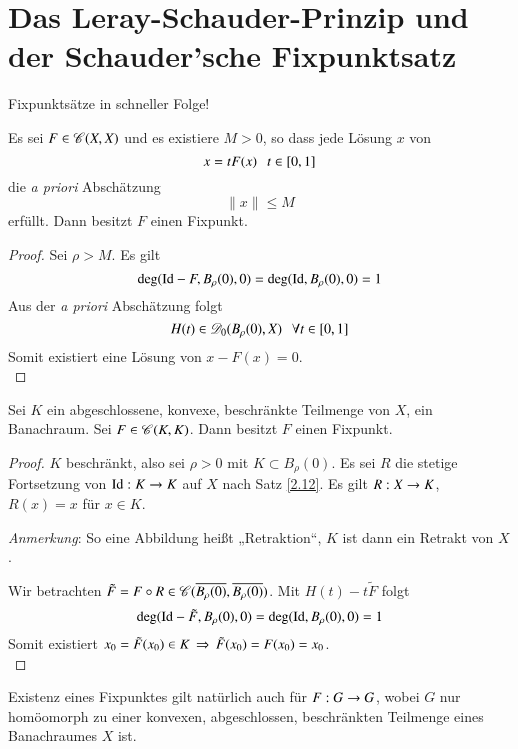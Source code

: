\section{Das Leray-Schauder-Prinzip und der Schauder'sche Fixpunktsatz}

Fixpunktsätze in schneller Folge!

\begin{theorem}\label{3.12}
    Es sei $F\in \mathscr C(X,X)$ und es existiere $M>0$, so dass jede Lösung $x$ von
    \[
        x=tF(x) \hspace{.25cm} t\in [0,1]
    \]
    die \textit{a priori} Abschätzung
    \[
        \|x\|\leq M
    \]
    erfüllt. Dann besitzt $F$ einen Fixpunkt.
\end{theorem}

\begin{proof}
    Sei $\rho>M$. Es gilt
    \[
        \deg(\mathrm{Id}-F,B_\rho(0),0)=\deg(\mathrm{Id},B_\rho(0),0)=1
    \]
    Aus der \textit{a priori} Abschätzung folgt
    \[
        H(t)\in \mathscr D_0(B_\rho(0),X) \hspace{.25cm} \forall t\in [0,1]
    \]
    Somit existiert eine Lösung von $x-F(x)=0$.
    \[ \]
\end{proof}

\begin{theorem}\label{3.13}
    Sei $K$ ein abgeschlossene, konvexe, beschränkte Teilmenge von $X$, ein Banachraum. Sei
    $F\in \mathscr C(K,K)$. Dann besitzt $F$ einen Fixpunkt.
\end{theorem}

\begin{proof}
    $K$ beschränkt, also sei $\rho>0$ mit $K\subset B_\rho(0)$. Es sei $R$ die stetige Fortsetzung von
    $\mathrm{Id}:K\rightarrow K$ auf $X$ nach Satz \ref{2.12}. Es gilt $R:X\rightarrow K$, $R(x)=x$ für $x\in K$.

    \noindent\textit{Anmerkung}: So eine Abbildung heißt „Retraktion“, $K$ ist dann ein Retrakt von $X$.

    \noindent Wir betrachten $\tilde F=F\circ R\in \mathscr C(\overline{B_\rho(0)},\overline{B_\rho(0)})$. Mit $H(t)
    -t\tilde F$ folgt
    \[
        \deg(\mathrm{Id}-\tilde F, B_\rho(0),0)=\deg(\mathrm{Id},B_\rho(0),0)=1
    \]
    Somit existiert $x_0=\tilde F(x_0)\in K \, \Rightarrow \, \tilde F(x_0)=F(x_0)=x_0$. 
    \[ \]
\end{proof}

\begin{remark}
    Existenz eines Fixpunktes gilt natürlich auch für $F:G\rightarrow G$, wobei $G$ nur homöomorph zu einer
    konvexen, abgeschlossen, beschränkten Teilmenge eines Banachraumes $X$ ist.
\end{remark}

